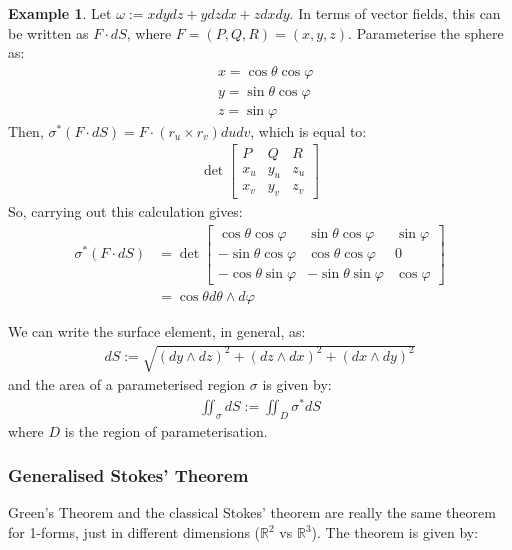 \documentclass[11pt]{scrartcl}
\newcommand{\R}[0]{\mathbb{R}}
\theoremstyle{definition}
\newtheorem{ex}{Example}
\theoremstyle{remark}
\begin{document}
{\begin{ex}
	Let $\omega := x dy dz + y dz dx + z dx dy$. In terms of vector fields, this can be written as $F \cdot dS$, where $F = (P, Q, R) = (x,y,z)$. Parameterise the sphere as: 
	\begin{align*}
		& x = \cos \theta \cos \varphi \\
		& y = \sin \theta \cos \varphi \\
		& z = \sin \varphi 
	\end{align*}
	Then, $\sigma^* (F \cdot dS) = F \cdot (r_u \times r_v) du dv$, which is equal to: 
	\begin{align}
		\det \begin{bmatrix} 
 	P & Q & R \\
 	x_u & y_u & z_u \\
 	x_v & y_v & z_v 	
 	\end{bmatrix}
	\end{align}
	So, carrying out this calculation gives: 
	\begin{align*}
		\sigma^*(F \cdot dS) &  = \det \begin{bmatrix}
			\cos \theta \cos \varphi & \sin \theta \cos \varphi & \sin \varphi \\
			- \sin \theta \cos \varphi & \cos \theta \cos \varphi & 0 \\
			- \cos \theta \sin \varphi & - \sin \theta \sin \varphi & \cos \varphi 
		\end{bmatrix} \\
		& = \cos \theta d \theta \wedge d \varphi 
	\end{align*}
\end{ex}

We can write the surface element, in general, as: 
\begin{align}
	dS := \sqrt{(dy \wedge dz)^2 + (dz \wedge dx)^2 + (dx \wedge dy)^2}	
\end{align}
and the area of a parameterised region $\sigma$ is given by:
\begin{align}
	\iint_\sigma dS := \iint_D \sigma^* dS 
\end{align}
where $D$ is the region of parameterisation. 

\subsubsection{Generalised Stokes' Theorem}
Green's Theorem and the classical Stokes' theorem are really the same theorem for 1-forms, just in different dimensions ($\R^2$ vs $\R^3$). The theorem is given by: 

}
\end{document}
